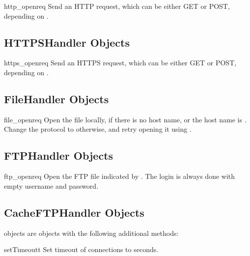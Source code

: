 \begin{methoddesc}[HTTPHandler]{http_open}{req}
Send an HTTP request, which can be either GET or POST, depending on
.
\end{methoddesc}


\subsection{HTTPSHandler Objects \label{https-handler-objects}}

\begin{methoddesc}[HTTPSHandler]{https_open}{req}
Send an HTTPS request, which can be either GET or POST, depending on
.
\end{methoddesc}


\subsection{FileHandler Objects \label{file-handler-objects}}

\begin{methoddesc}[FileHandler]{file_open}{req}
Open the file locally, if there is no host name, or
the host name is . Change the
protocol to  otherwise, and retry opening
it using .
\end{methoddesc}


\subsection{FTPHandler Objects \label{ftp-handler-objects}}

\begin{methoddesc}[FTPHandler]{ftp_open}{req}
Open the FTP file indicated by .
The login is always done with empty username and password.
\end{methoddesc}


\subsection{CacheFTPHandler Objects \label{cacheftp-handler-objects}}

 objects are  objects with
the following additional methods:

\begin{methoddesc}[CacheFTPHandler]{setTimeout}{t}
Set timeout of connections to  seconds.
\end{methoddesc}


